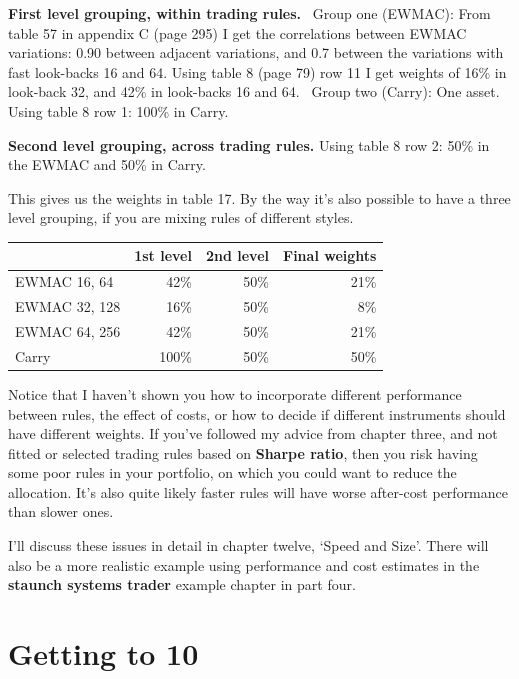 \medskip \noindent\textbf{First level grouping, within trading rules.} \textbullet\ Group one (EWMAC): From table 57 in appendix C (page 295) I get the correlations between EWMAC variations: 0.90 between adjacent variations, and 0.7 between the variations with fast look-backs 16 and 64. Using table 8 (page 79) row 11 I get weights of 16\% in look-back 32, and 42\% in look-backs 16 and 64. \textbullet\ Group two (Carry): One asset. Using table 8 row 1: 100\% in Carry.

\medskip \noindent\textbf{Second level grouping, across trading rules.} Using table 8 row 2: 50\% in the EWMAC and 50\% in Carry.

This gives us the weights in table 17. By the way it's also possible to have a three level grouping, if you are mixing rules of different styles.

 \begingroup \small \centering \begin{tabular}{@{} lrrr@{}}
\toprule
& 1st level & 2nd level & Final weights \\
\midrule
EWMAC 16, 64 & 42\% & 50\% & 21\% \\
EWMAC 32, 128 & 16\% & 50\% & 8\% \\
EWMAC 64, 256 & 42\% & 50\% & 21\% \\
Carry & 100\% & 50\% & 50\% \\
\bottomrule
\end{tabular}
\par \endgroup

Notice that I haven’t shown you how to incorporate different performance between rules, the effect of costs, or how to decide if different instruments should have different weights. If you’ve followed my advice from chapter three, and not fitted or selected trading rules based on \textbf{Sharpe ratio}, then you risk having some poor rules in your portfolio, on which you could want to reduce the allocation. It’s also quite likely faster rules will have worse after-cost performance than slower ones.

I’ll discuss these issues in detail in chapter twelve, ‘Speed and Size’. There will also be a more realistic example using performance and cost estimates in the \textbf{staunch systems trader} example chapter in part four.

\section*{Getting to 10}  {}

